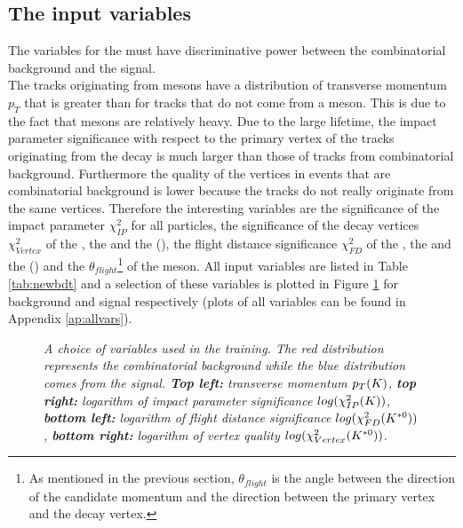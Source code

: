 \subsection{The input variables}
\label{sec:variables}
The variables for the \bdtn must have discriminative power between the combinatorial background and the \BdKstee signal.\\
The tracks originating from \Bd mesons have a distribution of transverse momentum $p_T$ that is greater than for tracks that do not come from a \Bd meson. This is due to the fact that \Bd mesons are relatively heavy. Due to the large \Bd lifetime, the impact parameter significance with respect to the primary vertex of the tracks originating from the \Bd decay is much larger than those of tracks from combinatorial background. Furthermore the quality of the vertices in events that are combinatorial background is lower because the tracks do not really originate from the same vertices. Therefore the interesting variables are the significance of the impact parameter $\chi^2_{IP}$ for all particles, the significance of the decay vertices $\chi^2_{Vertex}$ of the \Bd, the \Kstarz and the (\epem), the flight distance significance $\chi^2_{FD}$ of the \Bd, the \Kstarz and the (\epem) and the $\theta_{flight}$\footnote{As mentioned in the previous section, $\theta_{flight}$ is the angle between the direction of the \Bd candidate momentum and the direction between the primary vertex and the \B decay vertex.} of the \Bd meson. All input variables are listed in Table \ref{tab:newbdt} and a selection of these variables is plotted in Figure \ref{fig:variables} for background and signal respectively (plots of all variables can be found in Appendix \ref{ap:allvars}).\\
\begin{figure}[ht]
\vspace*{-0.5cm}
\begin{center}
\centering
{}
\centering
{}
\end{center}
\caption{\textit{A choice of variables used in the \bdtn training. The red distribution represents the combinatorial background while the blue distribution comes from the signal. \textbf{Top left:} \kaon transverse momentum $p_T(K)$, \textbf{top right:} logarithm of \kaon impact parameter significance $log(\chi^2_{IP}(K))$, \textbf{bottom left:} logarithm of \Kstarz flight distance significance $log(\chi^2_{FD}(K^{*0}))$, \textbf{bottom right:} logarithm of \Kstarz vertex quality $log(\chi^2_{Vertex}(K^{*0}))$. }}
\label{fig:variables}
\end{figure}

